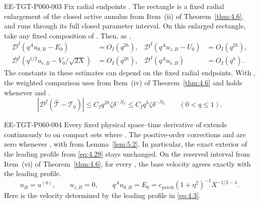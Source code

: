 \begin{proposition}
\begin{EESegment}{EE-TGT-P060-003}
Fix radial endpoints . The rectangle
 is a fixed radial enlargement of the closed active
annulus  from Item~\textup{(ii)} of Theorem~\ref{thm:4.6}, and
 runs through its full closed parameter interval. On this enlarged rectangle, take any fixed
composition  of
. Then, as ,
\begin{equation}
 \begin{aligned}
  \mathscr D^I(q^Au_{\theta,B}-E_0)&=O_I(q^{2h}),
  &\mathscr D^I(q^Au_{z,B}-U_0)&=O_I(q^{2h}),\\
  \mathscr D^I(q^{1/2}u_{r,B}-V_0/\sqrt{2X})&=O_I(q^{2h}),
  &\mathscr D^I(q^Au_{r,B})&=O_I(q^h).
 \end{aligned}
 \tag{5.42}\label{eq:5.42}
\end{equation}
The constants in these estimates can depend on the fixed radial endpoints. With
, the weighted comparison uses
 from Item~\textup{(iv)} of Theorem~\ref{thm:4.6} and holds whenever
 and .
\begin{equation}
 |\mathscr D^I(\widehat{\mathcal T}-\mathcal T_0)|
 \leq C_Iq^{2h}\zeta\delta^{-N_I}
 \leq C_Iq^h\zeta\delta^{-N_I}
 \qquad(0<q\leq1).
 \tag{5.43}\label{eq:5.43}
\end{equation}
\end{EESegment}

\begin{EESegment}{EE-TGT-P060-004}
Every fixed physical space--time derivative of
 extends continuously to
 on compact sets where . The positive-order corrections
 and  are zero whenever
, with  from Lemma~\ref{lem:5.2}. In particular, the exact
exterior of the leading profile from \eqref{eq:4.29} stays unchanged. On the reserved interval
 from Item~\textup{(vi)} of
Theorem~\ref{thm:4.6}, for every , the base velocity agrees exactly with the leading
profile.
\begin{equation}
 u_B=u^{(0)},
 \qquad u_{z,B}=0,
 \qquad q^Au_{\theta,B}=E_0=c_{\mathrm{patch}}(1+\eta^2)^{-1}X^{-1/2-\lambda}.
 \tag{5.44}\label{eq:5.44}
\end{equation}
Here  is the velocity determined by the leading profile in \eqref{eq:4.3}.
\end{EESegment}
\end{proposition}

